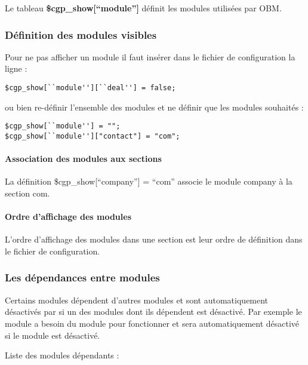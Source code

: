 Le tableau \textbf{\$cgp\_show[``module'']} définit les modules utilisées par OBM.

\subsubsection{Définition des modules visibles}

Pour ne pas afficher un module il faut insérer dans le fichier de configuration la ligne :

\begin{verbatim}
$cgp_show[``module''][``deal''] = false;
\end{verbatim}
\vspace{0.3cm}

ou bien re-définir l'ensemble des modules et ne définir que les modules souhaités : 

\begin{verbatim}  
$cgp_show[``module''] = "";
$cgp_show[``module'']["contact"] = "com";
\end{verbatim}

\paragraph{Association des modules aux sections}

La définition \$cgp\_show[``company''] = ``com'' associe le module company à la section com.

\paragraph{Ordre d'affichage des modules}

L'ordre d'affichage des modules dans une section est leur ordre de définition dans le fichier de configuration.


\subsubsection{Les dépendances entre modules}

Certains modules dépendent d'autres modules et sont automatiquement désactivés par \obm si un des modules dont ils dépendent est désactivé.
Par exemple le module \deal a besoin du module \company pour fonctionner et sera automatiquement désactivé si le module \company est désactivé.

Liste des modules dépendants :\\

